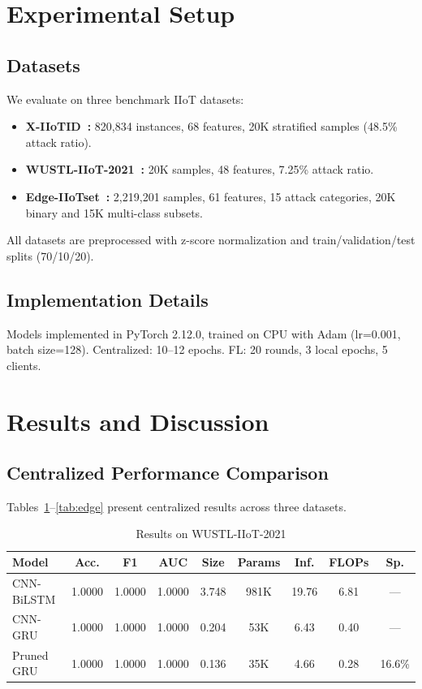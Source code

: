 \documentclass[preprint,12pt]{elsarticle}
\begin{document}
\section{Experimental Setup}
\label{sec:setup}

\subsection{Datasets}

We evaluate on three benchmark IIoT datasets:
\begin{itemize}
    \item \textbf{X-IIoTID~\cite{alhawawreh2021xiitoid}:} 820,834 instances, 68 features, 20K stratified samples (48.5\% attack ratio).
    \item \textbf{WUSTL-IIoT-2021~\cite{zolanvari2021wustl}:} 20K samples, 48 features, 7.25\% attack ratio.
    \item \textbf{Edge-IIoTset~\cite{ferrag2022edgeiiotset}:} 2,219,201 samples, 61 features, 15 attack categories, 20K binary and 15K multi-class subsets.
\end{itemize}
All datasets are preprocessed with z-score normalization and train/validation/test splits (70/10/20).

\subsection{Implementation Details}

Models implemented in PyTorch 2.12.0, trained on CPU with Adam (lr=0.001, batch size=128). Centralized: 10--12 epochs. FL: 20 rounds, 3 local epochs, 5 clients.

\section{Results and Discussion}
\label{sec:results}

\subsection{Centralized Performance Comparison}

Tables~\ref{tab:wustl}--\ref{tab:edge} present centralized results across three datasets.

\begin{table}[hbt]
\centering
\caption{Results on WUSTL-IIoT-2021}
\label{tab:wustl}
\begin{tabular}{lcccccccc}
\toprule
Model & Acc. & F1 & AUC & Size & Params & Inf. & FLOPs & Sp. \\
\midrule
CNN-BiLSTM & 1.0000 & 1.0000 & 1.0000 & 3.748 & 981K & 19.76 & 6.81 & --- \\
CNN-GRU & 1.0000 & 1.0000 & 1.0000 & 0.204 & 53K & 6.43 & 0.40 & --- \\
Pruned GRU & 1.0000 & 1.0000 & 1.0000 & 0.136 & 35K & 4.66 & 0.28 & 16.6\% \\
\bottomrule
\end{tabular}
\end{table}
\end{document}
